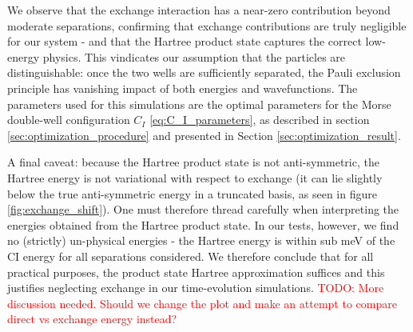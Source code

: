 \documentclass{subfiles}
\begin{document}
We observe that the exchange interaction has a near-zero contribution beyond moderate separations, confirming that exchange contributions are truly negligible for our system - and that the Hartree product state captures the correct low-energy physics. This vindicates our assumption that the particles are distinguishable: once the two wells are sufficiently separated, the Pauli exclusion principle has vanishing impact of both energies and wavefunctions. The parameters used for this simulations are the optimal parameters for the Morse double-well configuration $C_I$ \eqref{eq:C_I_parameters}, as described in section \ref{sec:optimization_procedure} and presented in Section \ref{sec:optimization_result}. 

A final caveat: because the Hartree product state is not anti-symmetric, the Hartree energy is not variational with respect to exchange (it can lie slightly below the true anti-symmetric energy in a truncated basis, as seen in figure \ref{fig:exchange_shift}). One must therefore thread carefully when interpreting the energies obtained from the Hartree product state. In our tests, however, we find no (strictly) un-physical energies - the Hartree energy is within sub meV of the CI energy for all separations considered. We therefore conclude that for all practical purposes, the product state Hartree approximation suffices and this justifies neglecting exchange in our time-evolution simulations. \textcolor{red}{TODO: More discussion needed. Should we change the plot and make an attempt to compare direct vs exchange energy instead?}
\end{document}
